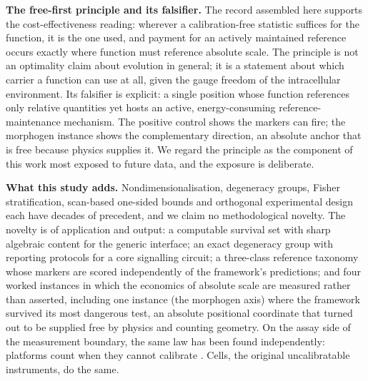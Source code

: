 \documentclass[11pt,a4paper]{article}
\begin{document}
\textbf{The free-first principle and its falsifier.} The record assembled here supports the cost-effectiveness reading: wherever a calibration-free statistic suffices for the function, it is the one used, and payment for an actively maintained reference occurs exactly where function must reference absolute scale. The principle is not an optimality claim about evolution in general; it is a statement about which carrier a function can use at all, given the gauge freedom of the intracellular environment. Its falsifier is explicit: a single position whose function references only relative quantities yet hosts an active, energy-consuming reference-maintenance mechanism. The positive control shows the markers can fire; the morphogen instance shows the complementary direction, an absolute anchor that is free because physics supplies it. We regard the principle as the component of this work most exposed to future data, and the exposure is deliberate.

\textbf{What this study adds.} Nondimensionalisation, degeneracy groups, Fisher stratification, scan-based one-sided bounds and orthogonal experimental design each have decades of precedent, and we claim no methodological novelty. The novelty is of application and output: a computable survival set with sharp algebraic content for the generic interface; an exact degeneracy group with reporting protocols for a core signalling circuit; a three-class reference taxonomy whose markers are scored independently of the framework's predictions; and four worked instances in which the economics of absolute scale are measured rather than asserted, including one instance (the morphogen axis) where the framework survived its most dangerous test, an absolute positional coordinate that turned out to be supplied free by physics and counting geometry. On the assay side of the measurement boundary, the same law has been found independently: platforms count when they cannot calibrate \cite{Guo2026,Vogelstein1999}. Cells, the original uncalibratable instruments, do the same.
\end{document}
